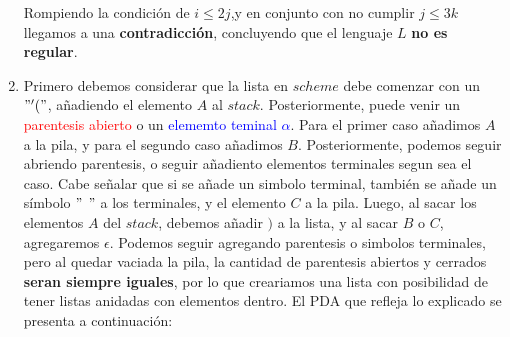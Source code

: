 \documentclass[spanish, fleqn]{article}
\begin{document}
\begin{enumerate}
       Rompiendo la condición de $i \leq 2j$,y en conjunto con no cumplir $j \leq 3k$ llegamos a una \textbf{contradicción}, concluyendo que el lenguaje $L$ \textbf{no es regular}.
       
       
        \item Primero debemos considerar que la lista en $scheme$ debe comenzar con un $" ' ( "$, añadiendo el elemento $A$ al $stack$. Posteriormente, puede venir un \textcolor{red}{parentesis abierto} o un \textcolor{blue}{elememto teminal $\alpha$}. Para el primer caso añadimos $A$ a la pila, y para el segundo caso añadimos $B$. Posteriormente, podemos seguir abriendo parentesis, o seguir añadiento elementos terminales segun sea el caso. Cabe señalar que si se añade un simbolo terminal, también se añade un símbolo $"$  $"$ a los terminales, y el elemento $C$ a la pila. Luego, al sacar los elementos $A$ del $stack$, debemos añadir $)$ a la lista, y al sacar $B$ o $C$, agregaremos $\epsilon$. Podemos seguir agregando parentesis o simbolos terminales, pero al quedar vaciada la pila, la cantidad de parentesis abiertos y cerrados \textbf{seran siempre iguales}, por lo que creariamos una lista con posibilidad de tener listas anidadas con elementos dentro. El PDA que refleja lo explicado se presenta a continuación:
        

\end{enumerate}
\end{document}
